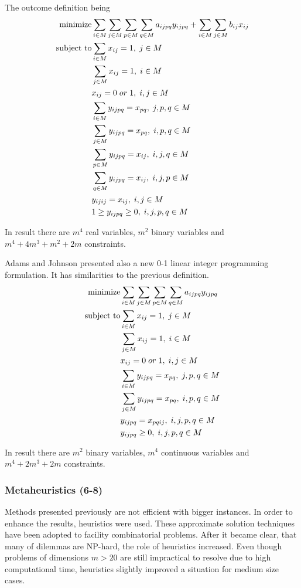 The outcome definition being
\begin{align}
  \text{minimize} &\null \sum_{i \in M} \sum_{j \in M} \sum_{p \in M} \sum_{q \in M} a_{ijpq}y_{ijpq} + \sum_{i \in M} \sum_{j \in M} b_{ij} x_{ij} \\
  \text{subject to} &\null \sum_{i \in M} x_{ij} = 1, \; j \in M \\
  &\null \sum_{j \in M} x_{ij} = 1, \; i \in M \\
  &\null x_{ij} = 0 \; or \; 1, \; i, j \in M \\
  &\null \sum_{i \in M} y_{ijpq} = x_{pq}, \; j, p, q \in M \\
  &\null \sum_{j \in M} y_{ijpq} = x_{pq}, \; i, p, q \in M \\
  &\null \sum_{p \in M} y_{ijpq} = x_{ij}, \; i, j, q \in M \\
  &\null \sum_{q \in M} y_{ijpq}= x_{ij}, \; i, j, p \in M \\
  &\null y_{ijij} = x_{ij}, \; i, j \in M \\
  &\null 1 \geq y_{ijpq} \geq 0, \; i, j, p, q \in M
\end{align}

In result there are $m^4$ real variables, $m^2$ binary variables and $m^4 + 4m^3+m^2+2m$ constraints.

Adams and Johnson \cite{adams1994improved} presented also a new 0-1 linear integer programming formulation.
It has similarities to the previous definition.
\begin{align}
  \text{minimize} &\null \sum_{i \in M} \sum_{j \in M} \sum_{p \in M} \sum_{q \in M} a_{ijpq}y_{ijpq} \\
  \text{subject to} &\null \sum_{i \in M} x_{ij} = 1, \; j \in M \\
  &\null \sum_{j \in M} x_{ij} = 1, \; i \in M \\
  &\null x_{ij} = 0 \; or \; 1, \; i, j \in M \\
  &\null \sum_{i \in M} y_{ijpq} = x_{pq}, \; j, p, q \in M \\
  &\null \sum_{j \in M} y_{ijpq} = x_{pq}, \; i, p, q \in M \\
  &\null y_{ijpq} = x_{pqij}, \; i, j, p, q \in M \\
  &\null y_{ijpq} \geq 0, \; i, j, p, q \in M
\end{align}

In result there are $m^2$ binary variables, $m^4$ continuous variables and $m^4+2m^3+2m$ constraints.

\subsubsection{Metaheuristics (6-8)}
Methods presented previously are not efficient with bigger instances.
In order to enhance the results, heuristics were used.
These approximate solution techniques have been adopted to facility combinatorial problems.
After it became clear, that many of dilemmas are NP-hard, the role of heuristics increased.
Even though problems of dimensions $m > 20$ are still impractical to resolve due to high computational time, heuristics slightly improved a situation for medium size cases.

